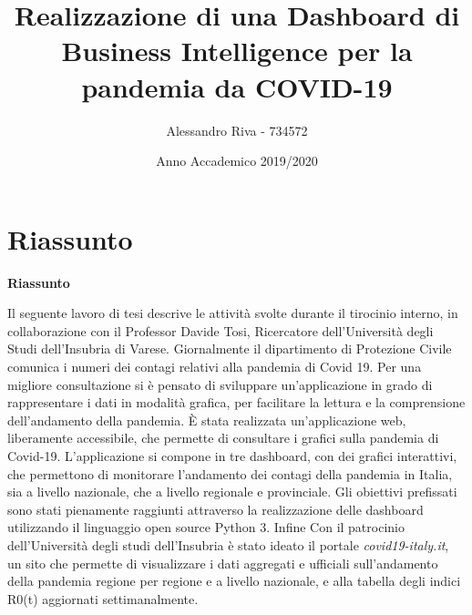 \documentclass{article}
\title{Realizzazione di una Dashboard di Business Intelligence per la pandemia da COVID-19}
\author{Alessandro Riva - 734572}
\date{Anno Accademico 2019/2020}
\makeatletter
\renewcommand{\abstractname}{Riassunto}
\renewenvironment{abstract}{%
    \if@twocolumn
      \section*{\abstractname}%
    \else
      \begin{center}%
        {\bfseries \Large\abstractname\vspace{\z@}}
      \end{center}%
      \quotation
    \fi}
    {\if@twocolumn\else\endquotation\fi}
\makeatother
\begin{document}
\maketitle
\begin{abstract}
    \large
    \noindent Il seguente lavoro di tesi descrive le attività svolte durante il tirocinio interno, in collaborazione con il Professor Davide Tosi, Ricercatore dell’Università degli Studi dell’Insubria di Varese.
    Giornalmente il dipartimento di Protezione Civile comunica i numeri dei contagi relativi alla pandemia di Covid 19.
    Per una migliore consultazione si è pensato di sviluppare un’applicazione in grado di rappresentare i dati in modalità grafica, per facilitare la lettura e la comprensione dell’andamento della pandemia.
    È stata realizzata un’applicazione web, liberamente accessibile,  che permette di consultare i grafici sulla pandemia di Covid-19.
    L’applicazione si compone in tre dashboard,  con dei grafici interattivi, che permettono di monitorare l’andamento dei contagi  della pandemia in Italia, sia a livello nazionale, che a livello regionale e provinciale.
    Gli obiettivi prefissati sono stati pienamente raggiunti attraverso la realizzazione delle dashboard utilizzando il linguaggio open source Python 3.
    Infine Con il patrocinio dell’Università degli studi dell’Insubria è stato ideato il portale \emph{covid19-italy.it}, un sito che permette di visualizzare i dati aggregati e ufficiali sull’andamento della pandemia regione per regione e a livello nazionale, e alla tabella degli indici R0(t) aggiornati settimanalmente.
\end{abstract}
\end{document}
